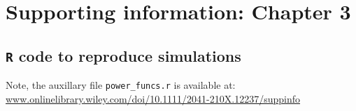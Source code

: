 
\chapter{Supporting information: Chapter 3} 

\section{\texttt{R} code to reproduce simulations}

Note, the auxillary file \texttt{power\_funcs.r} is available at:\\ \url{www.onlinelibrary.wiley.com/doi/10.1111/2041-210X.12237/suppinfo}


